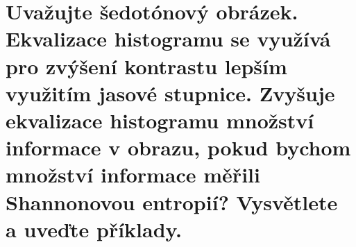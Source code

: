 \section{Uvažujte šedotónový obrázek. Ekvalizace histogramu se využívá pro zvýšení kontrastu lepším využitím jasové 
stupnice. Zvyšuje ekvalizace histogramu množství informace v obrazu, pokud bychom množství informace měřili Shannonovou 
entropií? Vysvětlete a uveďte příklady.}